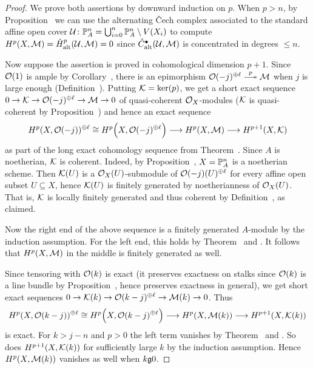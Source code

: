 \documentclass[a4paper,parskip=half,numbers=enddot, DIV=12]{scrreprt}
\newcommand{\vC}{\v{C}}
\renewcommand{\leq}{\leqslant}
\begin{document}
\begin{proof}
	We prove both assertions by downward induction on $p$. When $p>n$, by Proposition~ we can use the alternating \vC ech complex associated to the standard affine open cover $\mathcal{U}\colon \mathbb{P}_A^n=\bigcup_{i=0}^n\mathbb{P}_A^n\setminus V(X_i)$ to compute $H^p(X,\mathcal{M})=\check{H}_{\mathrm{alt}}^p(\mathcal{U},\mathcal{M})=0$ since $\check{C}_{\mathrm{alt}}^\bullet(\mathcal{U},\mathcal{M})$ is concentrated in degrees $\leq n$.
	
	Now suppose the assertion is proved in cohomological dimension $p+1$. Since $\mathcal{O}(1)$ is ample by Corollary~, there is an epimorphism $\Oo(-j)^{\oplus \ell}\epimorphism[p]\Mm$ when $j$ is large enough (Definition~). Putting $\mathcal{K}=\ker(p)$, we get a short exact sequence $0\morphism \Kk\morphism \Oo(-j)^{\oplus \ell}\morphism\Mm\morphism 0$ of quasi-coherent $\mathcal{O}_X$-modules ($\mathcal{K}$ is quasi-coherent by Proposition~) and hence an exact sequence
	\begin{align*}
		H^p(X,\Oo(-j))^{\oplus \ell}\cong H^p\Big(X,\Oo(-j)^{\oplus \ell}\Big)\morphism H^p(X,\Mm)\morphism H^{p+1}(X,\Kk)
	\end{align*}
	as part of the long exact cohomology sequence from Theorem~. Since $A$ is noetherian, $\mathcal{K}$ is coherent. Indeed, by Proposition~, $X=\mathbb{P}_A^n$ is a noetherian scheme. Then $\mathcal{K}(U)$ is a $\mathcal{O}_X(U)$-submodule of $\mathcal{O}(-j)(U)^{\oplus \ell}$ for every affine open subset $U\subseteq X$, hence $\mathcal{K}(U)$ is finitely generated by noetherianness of $\mathcal{O}_X(U)$. That is, $\mathcal{K}$ is locally finitely generated and thus coherent by Definition~, as claimed. 
	
	Now the right end of the above sequence is a finitely generated $A$-module by the induction assumption. For the left end, this holds by Theorem~ and . It follows that $H^p(X,\mathcal{M})$ in the middle is finitely generated as well. 
	
	Since tensoring with $\mathcal{O}(k)$ is exact (it preserves exactness on stalks since $\mathcal{O}(k)$ is a line bundle by Proposition~, hence preserves exactness in general), we get short exact sequences $0\morphism \Kk(k)\morphism \Oo(k-j)^{\oplus \ell}\morphism \Mm(k)\morphism 0$. Thus
	\begin{align*}
		H^p(X,\Oo(k-j))^{\oplus \ell}\cong H^p\Big(X,\Oo(k-j)^{\oplus \ell}\Big)\morphism H^p(X,\Mm(k))\morphism H^{p+1}(X,\Kk(k))
	\end{align*}
	is exact. For $k>j-n$ and $p>0$ the left term vanishes by Theorem~ and . So does $H^{p+1}(X,\mathcal{K}(k))$ for sufficiently large $k$ by the induction assumption. Hence $H^p(X,\mathcal{M}(k))$ vanishes as well when $k\gge 0$.
\end{proof}
\end{document}
